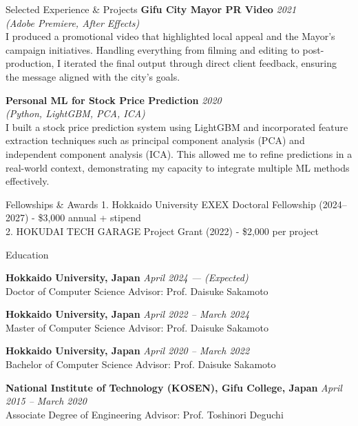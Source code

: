 \documentclass[
    11pt, %
]{resume} %
\begin{document}
\begin{rSection}{Selected Experience \& Projects}
\textbf{Gifu City Mayor PR Video} \hfill \textit{2021} \\
\textit{(Adobe Premiere, After Effects)} \\
I produced a promotional video that highlighted local appeal and the Mayor's campaign initiatives. Handling everything from filming and editing to post-production, I iterated the final output through direct client feedback, ensuring the message aligned with the city's goals.

\textbf{Personal ML for Stock Price Prediction} \hfill \textit{2020} \\
\textit{(Python, LightGBM, PCA, ICA)} \\
I built a stock price prediction system using LightGBM and incorporated feature extraction techniques such as principal component analysis (PCA) and independent component analysis (ICA). This allowed me to refine predictions in a real-world context, demonstrating my capacity to integrate multiple ML methods effectively.

\end{rSection}

\begin{rSection}{Fellowships \& Awards}
1. Hokkaido University EXEX Doctoral Fellowship (2024--2027) - \$3,000 annual + stipend \\
2. HOKUDAI TECH GARAGE Project Grant (2022) - \$2,000 per project
\end{rSection}

\begin{rSection}{Education}

\textbf{Hokkaido University, Japan} \hfill \textit{April 2024 --- (Expected)}\\
Doctor of Computer Science \quad Advisor: Prof. Daisuke Sakamoto

\textbf{Hokkaido University, Japan} \hfill \textit{April 2022 -- March 2024}\\
Master of Computer Science \quad Advisor: Prof. Daisuke Sakamoto

\textbf{Hokkaido University, Japan} \hfill \textit{April 2020 -- March 2022}\\
Bachelor of Computer Science \quad Advisor: Prof. Daisuke Sakamoto

\textbf{National Institute of Technology (KOSEN), Gifu College, Japan} \hfill \textit{April 2015 -- March 2020}\\
Associate Degree of Engineering \quad Advisor: Prof. Toshinori Deguchi

\end{rSection}
\end{document}
